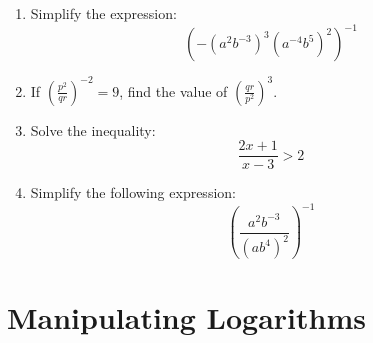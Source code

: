 \documentclass{article}
\begin{document}
\begin{enumerate}[leftmargin = 0.5cm, label = (\alph*), rightmargin = 0.2cm]
    \item Simplify the expression:
    \[
    \left( -(a^2b^{-3})^3(a^{-4}b^5)^2 \right)^{-1}
    \]

    \item If \( \left( \frac{p^2}{qr} \right)^{-2} = 9 \), find the value of \( \left( \frac{qr}{p^2} \right)^3 \).

    \item Solve the inequality:
    \[
    \frac{2x + 1}{x - 3} > 2
    \]

    \item Simplify the following expression:
    \[
    \left( \frac{a^2 b^{-3}}{(ab^4)^2} \right)^{-1}
    \]
    
\end{enumerate}

\section{Manipulating Logarithms}
\end{document}
